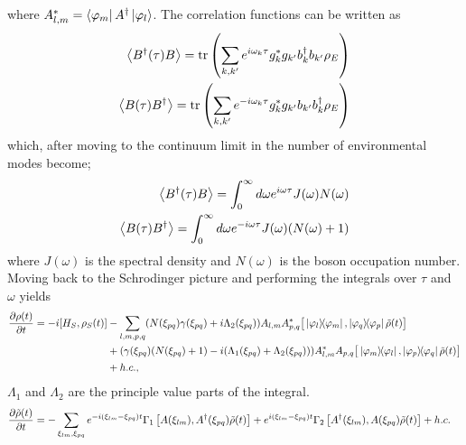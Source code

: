 \documentclass[]{article}
\begin{document}
where $A_{l,m}^*=\bra{\varphi_m}A^{\dagger}\ket{\varphi_l}$. The correlation functions can be written as
\begin{align}
	\begin{split}
		\expval{B^{\dagger}(\tau)B} = \tr\left(\sum_{k,k^{\prime}}e^{i\omega_k \tau}g_k^*g_{k^{\prime}} b_k^{\dagger}b_{k^{\prime}}\rho_E\right)\\
		\expval{B(\tau)B^{\dagger}}=\tr\left(\sum_{k,k^{\prime}}e^{-i\omega_k \tau}g_k^*g_{k^{\prime}} b_{k^{\prime}}b_k^{\dagger}\rho_E\right)
	\end{split}
\end{align}
which, after moving to the continuum limit in the number of environmental modes become;
\begin{align}
	\begin{split}
		\expval{B^{\dagger}(\tau)B} = \int_0^{\infty}d\omega e^{i\omega \tau}J(\omega)N(\omega)\\
		\expval{B(\tau)B^{\dagger}}=\int_0^{\infty}d\omega e^{-i\omega \tau}J(\omega)(N(\omega)+1)
	\end{split}
\end{align}
where $J(\omega)$ is the spectral density and $N(\omega)$ is the boson occupation number. Moving back to the Schrodinger picture and performing the integrals over $\tau$ and $\omega$ yields
\begin{align} 
	\begin{split}
		\pdv{\rho(t)}{t} = -i[H_S, \rho_S(t)] &- \sum_{l,m,p,q}  (N(\xi_{pq})\gamma(\xi_{pq})+i\Lambda_2(\xi_{pq})) A_{l,m}A_{p,q}^{*}\big[\dyad{\varphi_l}{\varphi_m}, \dyad{\varphi_q}{\varphi_p}\tilde{\rho}(t)\big] \\
		&+ (\gamma(\xi_{pq})(N(\xi_{pq})+1)-i(\Lambda_1(\xi_{pq})+\Lambda_2(\xi_{pq})))  A_{l,m}^{*}A_{p,q}\big[\dyad{\varphi_m}{\varphi_l}, \dyad{\varphi_p}{\varphi_q}\tilde{\rho}(t)\big]\\ &+ h.c.,
	\end{split}
\end{align}
$\Lambda_1$ and $\Lambda_2$ are the principle value parts of the integral.
\begin{align}
	\begin{split}
		\pdv{\tilde{\rho}(t)}{t} = - \sum_{\xi_{lm}, \xi_{pq}}  e^{-i(\xi_{lm}-\xi_{pq})t}\Gamma_1 \left[A(\xi_{lm}), A^{\dagger}(\xi_{pq})\tilde{\rho}(t)\right] 
		+   e^{i(\xi_{lm}-\xi_{pq})t} &\Gamma_2 \left[A^{\dagger}(\xi_{lm}), A(\xi_{pq})\tilde{\rho}(t)\right] + h.c.
	\end{split}
\end{align}
\end{document}
